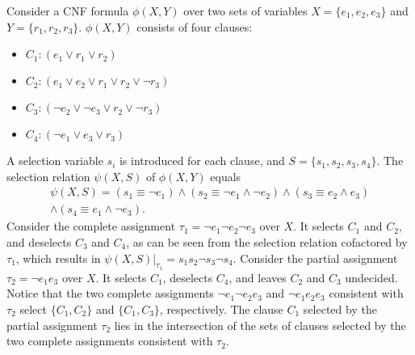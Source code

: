 \begin{example}\label{ex:select}
    Consider a CNF formula $\phi(X,Y)$ over two sets of variables $X=\{e_1,e_2,e_3\}$ and $Y=\{r_1,r_2,r_3\}$. $\phi(X,Y)$ consists of four clauses:
    \begin{itemize}
        \item[] $C_1: (e_1 \vee r_1 \vee r_2)$
        \item[] $C_2: (e_1 \vee e_2 \vee r_1 \vee r_2 \vee \neg r_3)$
        \item[] $C_3: (\neg e_2 \vee \neg e_3 \vee r_2 \vee \neg r_3)$
        \item[] $C_4: (\neg e_1 \vee e_3 \vee r_3)$
    \end{itemize}
    A selection variable $s_i$ is introduced for each clause, and $S=\{s_1,s_2,s_3,s_4\}$. The selection relation $\psi(X,S)$ of $\phi(X,Y)$ equals
    \begin{eqnarray*}
        \psi(X,S) = (s_1 \equiv \neg e_1)\wedge(s_2 \equiv \neg e_1 \wedge \neg e_2) \wedge (s_3 \equiv e_2 \wedge e_3) \\ \wedge(s_4 \equiv e_1 \wedge \neg e_3).
    \end{eqnarray*}
    Consider the complete assignment $\tau_1=\neg e_1 \neg e_2 \neg e_3$ over $X$. It selects $C_1$ and $C_2$, and deselects $C_3$ and $C_4$, as can be seen from the selection relation cofactored by $\tau_1$, which results in $\psi(X,S)|_{\tau_1}=s_1s_2\neg s_3 \neg s_4$.
    Consider the partial assignment $\tau_2=\neg e_1 e_3$ over $X$.
    It selects $C_1$, deselects $C_4$, and leaves $C_2$ and $C_3$ undecided.
    Notice that the two complete assignments $\neg e_1 \neg e_2 e_3$ and $\neg e_1 e_2 e_3$ consistent with $\tau_2$ select $\{C_1, C_2\}$ and $\{C_1, C_3\}$, respectively.
    The clause $C_1$ selected by the partial assignment $\tau_2$ lies in the intersection of the sets of clauses selected by the two complete assignments consistent with $\tau_2$.
\end{example}